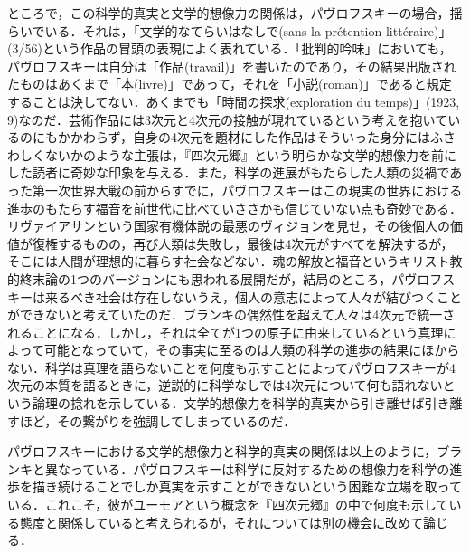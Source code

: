 ところで，この科学的真実と文学的想像力の関係は，パヴロフスキーの場合，揺らいでいる．それは，「文学的なてらいはなしで(sans la prétention littéraire)」(3/56)という作品の冒頭の表現によく表れている．「批判的吟味」においても，パヴロフスキーは自分は「作品(travail)」を書いたのであり，その結果出版されたものはあくまで「本(livre)」であって，それを「小説(roman)」であると規定することは決してない．あくまでも「時間の探求(exploration du temps)」(1923, 9)なのだ．芸術作品には3次元と4次元の接触が現れているという考えを抱いているのにもかかわらず，自身の4次元を題材にした作品はそういった身分にはふさわしくないかのような主張は，『四次元郷』という明らかな文学的想像力を前にした読者に奇妙な印象を与える．また，科学の進展がもたらした人類の災禍であった第一次世界大戦の前からすでに，パヴロフスキーはこの現実の世界における進歩のもたらす福音を前世代に比べていささかも信じていない点も奇妙である．リヴァイアサンという国家有機体説の最悪のヴィジョンを見せ，その後個人の価値が復権するものの，再び人類は失敗し，最後は4次元がすべてを解決するが，そこには人間が理想的に暮らす社会などない．魂の解放と福音というキリスト教的終末論の1つのバージョンにも思われる展開だが，結局のところ，パヴロフスキーは来るべき社会は存在しないうえ，個人の意志によって人々が結びつくことができないと考えていたのだ．ブランキの偶然性を超えて人々は4次元で統一されることになる．しかし，それは全てが1つの原子に由来しているという真理によって可能となっていて，その事実に至るのは人類の科学の進歩の結果にほからない．科学は真理を語らないことを何度も示すことによってパヴロフスキーが4次元の本質を語るときに，逆説的に科学なしでは4次元について何も語れないという論理の捻れを示している．文学的想像力を科学的真実から引き離せば引き離すほど，その繋がりを強調してしまっているのだ．

パヴロフスキーにおける文学的想像力と科学的真実の関係は以上のように，ブランキと異なっている．パヴロフスキーは科学に反対するための想像力を科学の進歩を描き続けることでしか真実を示すことができないという困難な立場を取っている．これこそ，彼がユーモアという概念を『四次元郷』の中で何度も示している態度と関係していると考えられるが，それについては別の機会に改めて論じる．
